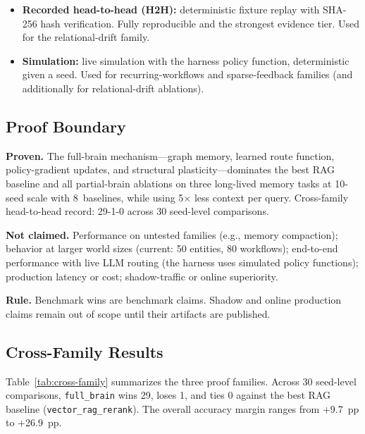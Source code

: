 \documentclass[11pt]{article}
\begin{document}
\begin{itemize}
  \item \textbf{Recorded head-to-head (H2H):} deterministic fixture replay with
        SHA-256 hash verification. Fully reproducible and the strongest evidence
        tier. Used for the relational-drift family.
  \item \textbf{Simulation:} live simulation with the harness policy function,
        deterministic given a seed. Used for recurring-workflows and
        sparse-feedback families (and additionally for relational-drift
        ablations).
\end{itemize}

\subsection{Proof Boundary}
\label{sec:proof-boundary}

\noindent\textbf{Proven.}
The full-brain mechanism---graph memory, learned route function, policy-gradient
updates, and structural plasticity---dominates the best RAG baseline and all
partial-brain ablations on three long-lived memory tasks at 10-seed scale with
8~baselines, while using 5$\times$ less context per query.
Cross-family head-to-head record: 29-1-0 across 30 seed-level comparisons.

\noindent\textbf{Not claimed.}
Performance on untested families (e.g., memory compaction); behavior at larger
world sizes (current: 50 entities, 80 workflows); end-to-end performance with
live LLM routing (the harness uses simulated policy functions); production
latency or cost; shadow-traffic or online superiority.

\noindent\textbf{Rule.}
Benchmark wins are benchmark claims. Shadow and online production claims remain
out of scope until their artifacts are published.

\subsection{Cross-Family Results}
\label{sec:cross-family}

Table~\ref{tab:cross-family} summarizes the three proof families.
Across 30 seed-level comparisons, \texttt{full\_brain} wins 29, loses 1,
and ties 0 against the best RAG baseline (\texttt{vector\_rag\_rerank}).
The overall accuracy margin ranges from +9.7~pp to +26.9~pp.
\end{document}

